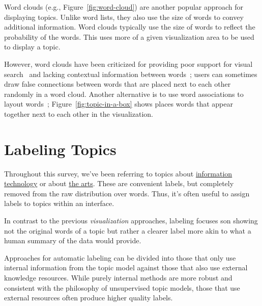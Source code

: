 Word clouds (e.g., Figure~\ref{fig:word-cloud}) are another popular approach for
displaying topics.  Unlike word lists, they also use the size of words to convey
additional information. Word clouds typically use the size of words to reflect
the probability of the words.  This uses more of a given visualization area to
be used to display a topic.

However, word clouds have been criticized for providing poor support for visual
search~\cite{Viegas2008} and lacking contextual information between
words~\cite{harris11}; users can sometimes draw false connections between words
that are placed next to each other randomly in a word cloud.  Another
alternative is to use word associations to layout
words~\citep{Smith:Chuang:Hu:Boyd-Graber:Findlater-2014};
Figure~\ref{fig:topic-in-a-box} shows places words that appear together next to
each other in the visualization.



\section{Labeling Topics}

Throughout this survey, we've been referring to topics about
\underline{information technology} or about \underline{the arts}.  These are
convenient labels, but completely removed from the raw distribution over words.
Thus, it's often useful to assign labels to topics within an interface.

In contrast to the previous \emph{visualization} approaches, labeling
focuses son showing not the original words of a topic but rather a
clearer label more akin to what a human summary of the data would
provide.

Approaches for automatic labeling can be divided into those that only
use internal information from the topic model against those that also
use external knowledge resources.  While purely internal methods are
more robust and consistent with the philosophy of unsupervised topic
models, those that use external resources often produce higher quality
labels.

